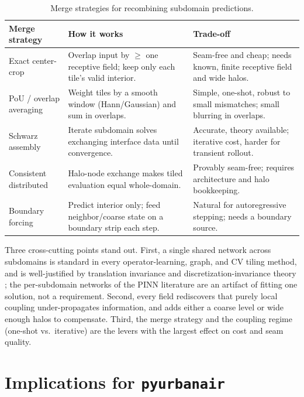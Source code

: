 \documentclass[11pt]{article}
\begin{document}
\begin{table}[t]
\centering\small
\begin{tabularx}{\textwidth}{@{}l Y Y@{}}
\toprule
\textbf{Merge strategy} & \textbf{How it works} & \textbf{Trade-off} \\
\midrule
Exact center-crop & Overlap input by $\geq$ one receptive field; keep only each tile's valid interior. & Seam-free and cheap; needs known, finite receptive field and wide halos. \\
PoU / overlap averaging & Weight tiles by a smooth window (Hann/Gaussian) and sum in overlaps. & Simple, one-shot, robust to small mismatches; small blurring in overlaps. \\
Schwarz assembly & Iterate subdomain solves exchanging interface data until convergence. & Accurate, theory available; iterative cost, harder for transient rollout. \\
Consistent distributed & Halo-node exchange makes tiled evaluation equal whole-domain. & Provably seam-free; requires architecture and halo bookkeeping. \\
Boundary forcing & Predict interior only; feed neighbor/coarse state on a boundary strip each step. & Natural for autoregressive stepping; needs a boundary source. \\
\bottomrule
\end{tabularx}
\caption{Merge strategies for recombining subdomain predictions.}
\label{tab:merge}
\end{table}

Three cross-cutting points stand out. First, a single shared network across
subdomains is standard in every operator-learning, graph, and CV tiling method,
and is well-justified by translation invariance and discretization-invariance
theory \cite{kovachki2023neuraloperator}; the per-subdomain networks of the PINN
literature are an artifact of fitting one solution, not a requirement.
Second, every field rediscovers that purely local coupling under-propagates
information, and adds either a coarse level
\cite{dryja1994smalloverlap,dolean2024multilevel,li2020mgno} or wide enough
halos \cite{ye2024lno,barwey2024consistentgnn} to compensate. Third, the merge
strategy and the coupling regime (one-shot vs.\ iterative) are the levers with
the largest effect on cost and seam quality.

\section{Implications for \texttt{pyurbanair}}
\end{document}
